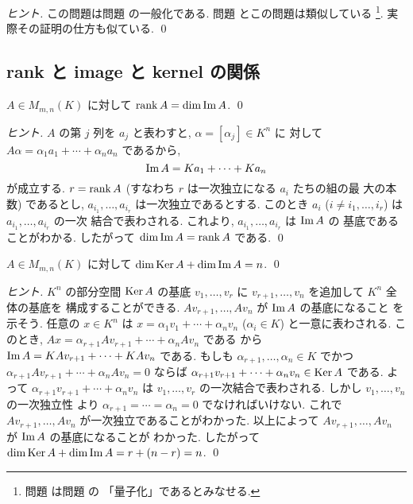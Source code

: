 \documentclass[12pt,twoside]{jarticle}
\begin{document}
\begin{proof}[ヒント]
  この問題は問題  の一般化である. 
  問題  とこの問題は類似している%
  \footnote{問題  は問題  の
    「量子化」であるとみなせる.}.  
  実際その証明の仕方も似ている.
  \qed
\end{proof}


\subsection{rank と image と kernel の関係}
\label{sec:rank-image-kernel}

\begin{question}
  \label{q:rank=dimImage}
  $A\in M_{m,n}(K)$ に対して $\mathop{\mathrm{rank}}\nolimits A = \dim\mathop{\mathrm{Im}}\nolimits A$. \qed
\end{question}

\begin{proof}[ヒント]
  $A$ の第 $j$ 列を $a_j$ と表わすと, $\alpha=[\alpha_j]\in K^n$ に
  対して $A\alpha = \alpha_1a_1+\cdots+\alpha_na_n$ であるから,
  \begin{equation*}
    \mathop{\mathrm{Im}}\nolimits A = Ka_1+\cdots+Ka_n
  \end{equation*}
  が成立する. $r=\mathop{\mathrm{rank}}\nolimits A$ (すなわち $r$ は一次独立になる $a_i$ たちの組の最
  大の本数) であるとし, $a_{i_1},\ldots,a_{i_r}$ は一次独立であるとする.
  このとき $a_i$ ($i\ne i_1,\ldots,i_r$) は $a_{i_1},\ldots,a_{i_r}$ の一次
  結合で表わされる.  これより, $a_{i_1},\ldots,a_{i_r}$ は $\mathop{\mathrm{Im}}\nolimits A$ の
  基底であることがわかる. したがって $\dim\mathop{\mathrm{Im}}\nolimits A = \mathop{\mathrm{rank}}\nolimits A$ である.
  \qed
\end{proof}


\begin{question}
  \label{q:nulity+rank=n}
  $A\in M_{m,n}(K)$ に対して $\dim\mathop{\mathrm{Ker}}\nolimits A + \dim\mathop{\mathrm{Im}}\nolimits A = n$.
  \qed
\end{question}

\begin{proof}[ヒント]
  $K^n$ の部分空間 $\mathop{\mathrm{Ker}}\nolimits A$ の基底 $v_1,\ldots,v_r$ 
  に $v_{r+1},\ldots,v_n$ を追加して $K^n$ 全体の基底を
  構成することができる.
  $Av_{r+1},\ldots,Av_n$ が $\mathop{\mathrm{Im}}\nolimits A$ の基底になること
  を示そう.  任意の $x\in K^n$ は $x=\alpha_1v_1+\cdots+\alpha_nv_n$ 
  ($\alpha_i\in K$) と一意に表わされる. 
  このとき, $Ax=\alpha_{r+1}Av_{r+1}+\cdots+\alpha_nAv_n$ である
  から $\mathop{\mathrm{Im}}\nolimits A =KAv_{r+1}+\cdots+KAv_n$ である.
  もしも $\alpha_{r+1},\ldots,\alpha_n\in K$ 
  でかつ $\alpha_{r+1}Av_{r+1}+\cdots+\alpha_nAv_n = 0$ 
  ならば $\alpha_{r+1}v_{r+1}+\cdots+\alpha_nv_n\in\mathop{\mathrm{Ker}}\nolimits A$ である.
  よって $\alpha_{r+1}v_{r+1}+\cdots+\alpha_nv_n$ は $v_1,\ldots,v_r$ 
  の一次結合で表わされる. しかし $v_1,\ldots,v_n$ の一次独立性
  より $\alpha_{r+1}=\cdots=\alpha_n=0$ でなければいけない.
  これで $Av_{r+1},\ldots,Av_n$ が一次独立であることがわかった.
  以上によって $Av_{r+1},\ldots,Av_n$ が $\mathop{\mathrm{Im}}\nolimits A$ の基底になることが
  わかった.  したがって $\dim\mathop{\mathrm{Ker}}\nolimits A+\dim\mathop{\mathrm{Im}}\nolimits A = r + (n-r)=n$.
  \qed
\end{proof}
\end{document}
